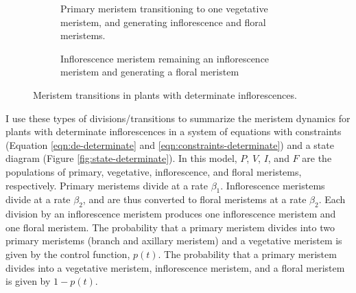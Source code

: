 \documentclass[12pt, oneside]{article}   	%
\begin{document}
\begin{figure}[hbt!]
\begin{subfigure}{.25\textwidth}
    \caption{Primary meristem transitioning to one vegetative meristem, and generating inflorescence and floral meristems.}
      \end{subfigure}
          \hspace{\fill}
      \begin{subfigure}{.25\textwidth}
\centering
    \caption{Inflorescence meristem remaining an inflorescence meristem and generating a floral meristem}
  \end{subfigure}
        \caption{Meristem transitions in plants with determinate inflorescences.}
    \label{fig:transitions-determinate}
\end{figure}

I use these types of divisions/transitions to summarize the meristem dynamics for plants with determinate inflorescences in a system of equations with constraints (Equation \ref{eqn:de-determinate} and \ref{eqn:constraints-determinate}) and a state diagram (Figure \ref{fig:state-determinate}). In this model, $P$, $V$, $I$, and $F$ are the populations of primary, vegetative, inflorescence, and floral meristems, respectively. Primary meristems divide at a rate $\beta_1$. Inflorescence meristems divide at a rate $\beta_2$, and are thus converted to floral meristems at a rate $\beta_2$. Each division by an inflorescence meristem produces one inflorescence meristem and one floral meristem. The probability that a primary meristem divides into two primary meristems (branch and axillary meristem) and a vegetative meristem is given by the control function, $p(t)$. The probability that a primary meristem divides into a vegetative meristem, inflorescence meristem, and a floral meristem is given by $1-p(t)$. 
\end{document}
